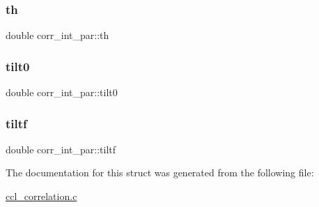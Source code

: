 \subsubsection{\texorpdfstring{th}{th}}
{\footnotesize\ttfamily double corr\+\_\+int\+\_\+par\+::th}

\mbox{\label{structcorr__int__par_afd5c7f46c3055457c5c01288aa686d74}} 
\subsubsection{\texorpdfstring{tilt0}{tilt0}}
{\footnotesize\ttfamily double corr\+\_\+int\+\_\+par\+::tilt0}

\mbox{\label{structcorr__int__par_a713ce7a30183713e4ed13509253c0299}} 
\subsubsection{\texorpdfstring{tiltf}{tiltf}}
{\footnotesize\ttfamily double corr\+\_\+int\+\_\+par\+::tiltf}



The documentation for this struct was generated from the following file\+:\begin{DoxyCompactItemize}
\item 
\mbox{\hyperlink{ccl__correlation_8c}{ccl\+\_\+correlation.\+c}}\end{DoxyCompactItemize}
